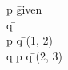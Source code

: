 \documentclass{article}
\begin{document}
\begin{proofbox}
\: p \= \hbox{given} \\
\open
\: q \= \asm \\
\: p \land q \= \andintro(1, 2) \\
\close
\: q \rightarrow p \land q \= \impliesintro(2, 3) \\
\end{proofbox}
\end{document}
